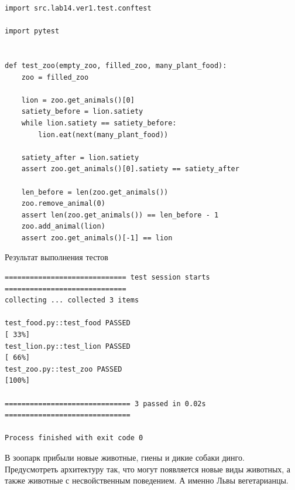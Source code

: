 \documentclass[a4paper,14pt]{extarticle}
\begin{document}
\begin{verbatim}
import src.lab14.ver1.test.conftest

import pytest


def test_zoo(empty_zoo, filled_zoo, many_plant_food):
    zoo = filled_zoo

    lion = zoo.get_animals()[0]
    satiety_before = lion.satiety
    while lion.satiety == satiety_before:
        lion.eat(next(many_plant_food))

    satiety_after = lion.satiety
    assert zoo.get_animals()[0].satiety == satiety_after

    len_before = len(zoo.get_animals())
    zoo.remove_animal(0)
    assert len(zoo.get_animals()) == len_before - 1
    zoo.add_animal(lion)
    assert zoo.get_animals()[-1] == lion

\end{verbatim}
Результат выполнения тестов
\begin{verbatim}
============================= test session starts =============================
collecting ... collected 3 items

test_food.py::test_food PASSED                                           [ 33%]
test_lion.py::test_lion PASSED                                           [ 66%]
test_zoo.py::test_zoo PASSED                                             [100%]

============================== 3 passed in 0.02s ==============================

Process finished with exit code 0
\end{verbatim}

В зоопарк прибыли новые
животные, гиены и дикие собаки
динго. Предусмотреть архитектуру
так, что могут появляется новые
виды животных, а также животные с
несвойственным поведением. А
именно Львы вегетарианцы.
\end{document}
